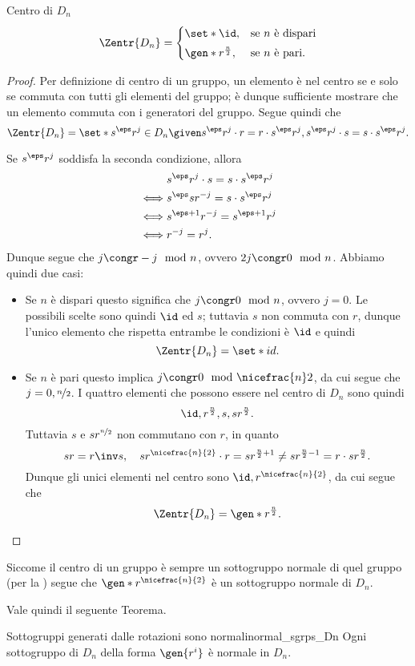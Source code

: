 \begin{proposition}{Centro di $D_n$}{}
    \[
        \Zentr{D_n} = \begin{cases}
            \set*{\id}, &\text{se } n \text{ è dispari}\\[3pt]
            \gen*{r^{\frac{n}2}}, &\text{se $n$ è pari}.
        \end{cases}   
    \]
\end{proposition}
\begin{proof}
    Per definizione di centro di un gruppo, un elemento è nel centro se e solo se commuta con tutti gli elementi del gruppo; è dunque sufficiente mostrare che un elemento commuta con i generatori del gruppo. Segue quindi che \[
        \Zentr{D_n} = \set*{s^\eps r^j \in D_n \given s^\eps r^j \cdot r = r \cdot s^\eps r^j, s^\eps r^j \cdot s = s \cdot s^\eps r^j}.
    \]

    Se $s^\eps r^j$ soddisfa la seconda condizione, allora \begin{align*}
        &s^\eps r^j \cdot s = s \cdot s^\eps r^j \\
        \iff &s^\eps sr^{-j} = s \cdot s^\eps r^j  \\
        \iff &s^{\eps + 1}r^{-j} = s^{\eps + 1} r^j\\
        \iff &r^{-j} = r^j.
    \end{align*} Dunque segue che $j \congr -j \mod{n}$, ovvero $2j \congr 0 \mod{n}$. Abbiamo quindi due casi:
    \begin{itemize}
        \item Se $n$ è dispari questo significa che $j \congr 0 \mod{n}$, ovvero $j = 0$. 
        Le possibili scelte sono quindi $\id$ ed $s$; tuttavia $s$ non commuta con $r$, dunque l'unico elemento che rispetta entrambe le condizioni è $\id$ e quindi \[
            \Zentr{D_n} = \set*{id}.    
        \]
        \item Se $n$ è pari questo implica $j \congr 0 \mod{\nicefrac{n}2}$, da cui segue che $j = 0, \nicefrac{n}2$. I quattro elementi che possono essere nel centro di $D_n$ sono quindi \[
            \id, r^{\frac{n}2}, s, sr^\frac{n}{2}.   
        \] Tuttavia $s$ e $sr^{\nicefrac{n}{2}}$ non commutano con $r$, in quanto \[
            sr = r\inv s, \quad sr^{\nicefrac{n}{2}} \cdot r = sr^{\frac{n}{2} + 1} \neq sr^{\frac{n}{2} - 1} = r \cdot sr^\frac{n}{2}.
    \]  Dunque gli unici elementi nel centro sono $\id, r^{\nicefrac{n}{2}}$, da cui segue che \[
        \Zentr{D_n} = \gen*{r^\frac{n}{2}}. \qedhere    
    \]
    \end{itemize}
\end{proof}

Siccome il centro di un gruppo è sempre un sottogruppo normale di quel gruppo (per la ) segue che $\gen*{r^{\nicefrac{n}{2}}}$ è un sottogruppo normale di $D_n$.

Vale quindi il seguente Teorema.

\begin{theorem}
    {Sottogruppi generati dalle rotazioni sono normali}{normal_sgrps_Dn}
    Ogni sottogruppo di $D_n$ della forma $\gen{r^i}$ è normale in $D_n$. 
\end{theorem}
